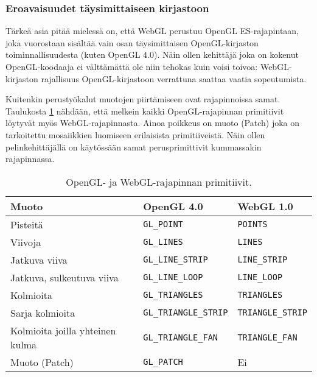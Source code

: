 \subsubsection{Eroavaisuudet täysimittaiseen kirjastoon}
Tärkeä asia pitää mielessä on, että WebGL perustuu OpenGL ES-rajapintaan, joka vuorostaan sisältää vain osan täysimittaisen OpenGL-kirjaston toiminnallisuudesta (kuten OpenGL 4.0)\cite{khronosopenwebgldiff}. Näin ollen kehittäjä joka on kokenut OpenGL-koodaaja ei välttämättä ole niin tehokas kuin voisi toivoa: WebGL-kirjaston rajallisuus OpenGL-kirjastoon verrattuna saattaa vaatia sopeutumista.

Kuitenkin perustyökalut muotojen piirtämiseen ovat rajapinnoissa samat. Taulukosta \ref{tab:primitives_open_web} nähdään, että melkein kaikki OpenGL-rajapinnan primitiivit löytyvät myös WebGL-rajapinnasta. Ainoa poikkeus on muoto (Patch) joka on tarkoitettu mosaiikkien luomiseen erilaisista primitiiveistä\cite{opengl_primitives}. Näin ollen pelinkehittäjällä on käytössään samat perusprimittivit kummassakin rajapinnassa.

\begin{table}[h]
    \caption{\label{tab:primitives_open_web}OpenGL-\cite{opengl_primitives} ja WebGL-rajapinnan\cite[5.14]{webgl_specification} primitiivit.}
    \begin{tabular}{|l|l|l|}
        \hline
        \textbf{Muoto} & \textbf{OpenGL 4.0} & \textbf{WebGL 1.0} \\ \hline
        Pisteitä & \texttt{GL\_POINT} & \texttt{POINTS} \\ \hline
        Viivoja & \texttt{GL\_LINES} & \texttt{LINES} \\ \hline
        Jatkuva viiva & \texttt{GL\_LINE\_STRIP} & \texttt{LINE\_STRIP} \\ \hline
        Jatkuva, sulkeutuva viiva & \texttt{GL\_LINE\_LOOP} & \texttt{LINE\_LOOP} \\ \hline
        Kolmioita & \texttt{GL\_TRIANGLES} & \texttt{TRIANGLES} \\ \hline
        Sarja kolmioita & \texttt{GL\_TRIANGLE\_STRIP} & \texttt{TRIANGLE\_STRIP} \\ \hline
        Kolmioita joilla yhteinen kulma & \texttt{GL\_TRIANGLE\_FAN} & \texttt{TRIANGLE\_FAN} \\ \hline
        Muoto (Patch) & \texttt{GL\_PATCH} & Ei \\ \hline
    \end{tabular}
\end{table}

